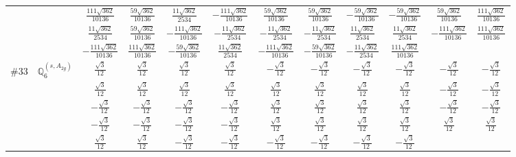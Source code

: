 \documentclass[fleqn,9pt,landscape]{jsarticle}
\begin{document}
\begin{center}
\begin{longtable}{lcccccccccc}
& $ \frac{111 \sqrt{362}}{10136} $ & $ \frac{59 \sqrt{362}}{10136} $ & $ \frac{11 \sqrt{362}}{2534} $ & $ - \frac{111 \sqrt{362}}{10136} $ & $ \frac{59 \sqrt{362}}{10136} $ & $ \frac{59 \sqrt{362}}{10136} $ & $ - \frac{59 \sqrt{362}}{10136} $ & $ - \frac{59 \sqrt{362}}{10136} $ & $ \frac{59 \sqrt{362}}{10136} $ & $ \frac{111 \sqrt{362}}{10136} $ \\
& $ \frac{11 \sqrt{362}}{2534} $ & $ \frac{59 \sqrt{362}}{10136} $ & $ - \frac{111 \sqrt{362}}{10136} $ & $ - \frac{11 \sqrt{362}}{2534} $ & $ - \frac{11 \sqrt{362}}{2534} $ & $ - \frac{11 \sqrt{362}}{2534} $ & $ \frac{11 \sqrt{362}}{2534} $ & $ \frac{11 \sqrt{362}}{2534} $ & $ - \frac{111 \sqrt{362}}{10136} $ & $ \frac{111 \sqrt{362}}{10136} $ \\
& $ - \frac{111 \sqrt{362}}{10136} $ & $ \frac{111 \sqrt{362}}{10136} $ & $ - \frac{59 \sqrt{362}}{10136} $ & $ \frac{11 \sqrt{362}}{2534} $ & $ - \frac{111 \sqrt{362}}{10136} $ & $ - \frac{59 \sqrt{362}}{10136} $ & $ - \frac{11 \sqrt{362}}{2534} $ & $ \frac{111 \sqrt{362}}{10136} $ & $  $ & $  $ \\ \hline
$ \#33\quad \mathbb{Q}_{6}^{(s,A_{2g})} $ & $ \frac{\sqrt{3}}{12} $ & $ \frac{\sqrt{3}}{12} $ & $ \frac{\sqrt{3}}{12} $ & $ \frac{\sqrt{3}}{12} $ & $ - \frac{\sqrt{3}}{12} $ & $ - \frac{\sqrt{3}}{12} $ & $ - \frac{\sqrt{3}}{12} $ & $ - \frac{\sqrt{3}}{12} $ & $ - \frac{\sqrt{3}}{12} $ & $ - \frac{\sqrt{3}}{12} $ \\
& $ \frac{\sqrt{3}}{12} $ & $ \frac{\sqrt{3}}{12} $ & $ \frac{\sqrt{3}}{12} $ & $ \frac{\sqrt{3}}{12} $ & $ \frac{\sqrt{3}}{12} $ & $ \frac{\sqrt{3}}{12} $ & $ \frac{\sqrt{3}}{12} $ & $ \frac{\sqrt{3}}{12} $ & $ - \frac{\sqrt{3}}{12} $ & $ - \frac{\sqrt{3}}{12} $ \\
& $ - \frac{\sqrt{3}}{12} $ & $ - \frac{\sqrt{3}}{12} $ & $ - \frac{\sqrt{3}}{12} $ & $ - \frac{\sqrt{3}}{12} $ & $ \frac{\sqrt{3}}{12} $ & $ \frac{\sqrt{3}}{12} $ & $ \frac{\sqrt{3}}{12} $ & $ \frac{\sqrt{3}}{12} $ & $ - \frac{\sqrt{3}}{12} $ & $ - \frac{\sqrt{3}}{12} $ \\
& $ - \frac{\sqrt{3}}{12} $ & $ - \frac{\sqrt{3}}{12} $ & $ - \frac{\sqrt{3}}{12} $ & $ - \frac{\sqrt{3}}{12} $ & $ \frac{\sqrt{3}}{12} $ & $ \frac{\sqrt{3}}{12} $ & $ \frac{\sqrt{3}}{12} $ & $ \frac{\sqrt{3}}{12} $ & $ \frac{\sqrt{3}}{12} $ & $ \frac{\sqrt{3}}{12} $ \\
& $ \frac{\sqrt{3}}{12} $ & $ \frac{\sqrt{3}}{12} $ & $ - \frac{\sqrt{3}}{12} $ & $ - \frac{\sqrt{3}}{12} $ & $ - \frac{\sqrt{3}}{12} $ & $ - \frac{\sqrt{3}}{12} $ & $ - \frac{\sqrt{3}}{12} $ & $ - \frac{\sqrt{3}}{12} $ & $  $ & $  $ \\ \hline

\end{longtable}
\end{center}
\end{document}
